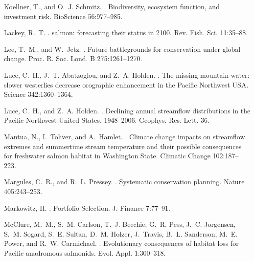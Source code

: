 \documentclass[12pt,english]{article}
\begin{document}
\begin{spacing}{1.3}
\begin{thebibliography}{64}
Koellner, T., and O.~J. Schmitz.
.
\newblock Biodiversity, ecosystem function, and investment risk.
\newblock BioScience 56:977--985.

Lackey, R.~T.
.
 salmon: forecasting their status in 2100.
\newblock Rev. Fish. Sci. 11:35--88.

Lee, T.~M., and W.~Jetz.
.
\newblock Future battlegrounds for conservation under global change.
\newblock Proc. R. Soc. Lond. B 275:1261--1270.

Luce, C.~H., J.~T. Abatzoglou, and Z.~A. Holden.
.
\newblock The missing mountain water: slower westerlies decrease orographic
  enhancement in the {Pacific Northwest USA}.
\newblock Science 342:1360--1364.

Luce, C.~H., and Z.~A. Holden.
.
\newblock Declining annual streamflow distributions in the {Pacific Northwest
  United States}, 1948--2006.
\newblock Geophys. Res. Lett. 36.

Mantua, N., I.~Tohver, and A.~Hamlet.
.
\newblock Climate change impacts on streamflow extremes and summertime stream
  temperature and their possible consequences for freshwater salmon habitat in
  {Washington State}.
\newblock Climatic Change 102:187--223.

Margules, C.~R., and R.~L. Pressey.
.
\newblock Systematic conservation planning.
\newblock Nature 405:243--253.

Markowitz, H.
.
\newblock Portfolio Selection.
\newblock J. Finance 7:77--91.

McClure, M.~M., S.~M. Carlson, T.~J. Beechie, G.~R. Pess, J.~C. Jorgensen,
  S.~M. Sogard, S.~E. Sultan, D.~M. Holzer, J.~Travis, B.~L. Sanderson, M.~E.
  Power, and R.~W. Carmichael.
.
\newblock Evolutionary consequences of habitat loss for {Pacific} anadromous
  salmonids.
\newblock Evol. Appl. 1:300--318.


\end{thebibliography}
\end{spacing}
\end{document}
